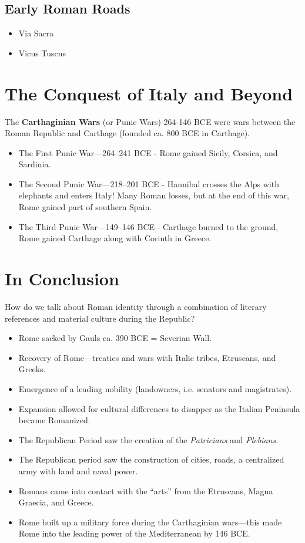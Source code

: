 \documentclass{article}
\begin{document}
\subsection{Early Roman Roads}
\begin{itemize}
\item Via Sacra
\item Vicus Tuscus
\end{itemize}
\section{The Conquest of Italy and Beyond}
The \textbf{Carthaginian Wars} (or Punic Wars) 264-146 BCE were wars between the Roman Republic and Carthage (founded ca. 800 BCE in Carthage).
\begin{itemize}
\item The First Punic War---264--241 BCE - Rome gained Sicily, Corsica, and Sardinia.
\item The Second Punic War---218--201 BCE - Hannibal crosses the Alps with elephants and enters Italy!  Many Roman losses, but at the end of this war, Rome gained part of southern Spain.
\item The Third Punic War---149--146 BCE - Carthage burned to the ground, Rome gained Carthage along with Corinth in Greece.
\end{itemize}
\section{In Conclusion}
How do we talk about Roman identity through a combination of literary references and material culture during the Republic?
\begin{itemize}
\item Rome sacked by Gauls ca. 390 BCE = Severian Wall.
\item Recovery of Rome---treaties and wars with Italic tribes, Etruscans, and Greeks.
\item Emergence of a leading nobility (landowners, i.e. senators and magistrates).
\item Expansion allowed for cultural differences to disapper as the Italian Peninsula became Romanized.
\item The Republican Period saw the creation of the \textit{Patricians} and \textit{Plebians}.
\item The Republican period saw the construction of cities, roads, a centralized army with land and naval power.
\item Romans came into contact with the ``arts'' from the Etruscans, Magna Graecia, and Greece.
\item Rome built up a military force during the Carthaginian wars---this made Rome into the leading power of the Mediterranean by 146 BCE.
\end{itemize}
\end{document}
